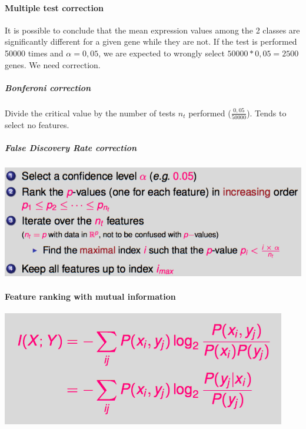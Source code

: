 \paragraph{Multiple test correction}

It is possible to conclude that the mean expression values among the 2 classes are significantly different for a given gene while they are not. If the test is performed 50000 times and $\alpha = 0,05$, we are expected to wrongly select $50000*0,05=2500$ genes. We need correction.

\subparagraph{Bonferoni correction}

Divide the critical value by the number of tests $n_t$ performed ($\frac{0,05}{50000}$). Tends to select no features.

\subparagraph{False Discovery Rate correction}

\begin{center}
	\includegraphics[scale=0.6]{images/62_fdr.png}
\end{center}


\newpage
\paragraph{Feature ranking with mutual information}

\begin{center}
	\includegraphics[scale=0.6]{images/63_mutual.png}
\end{center}


